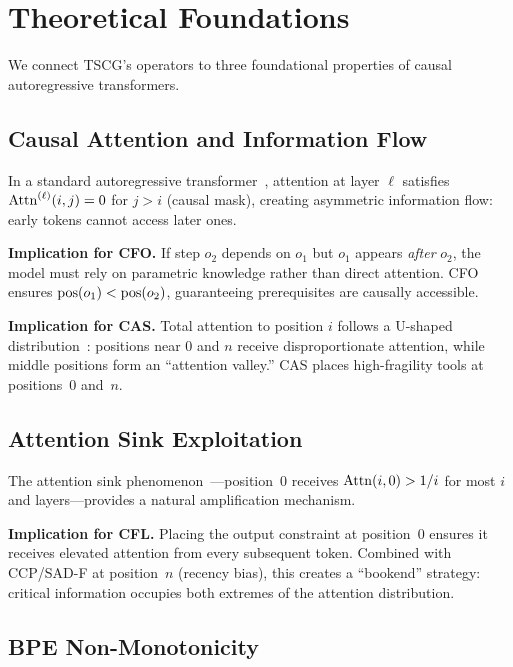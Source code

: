 \section{Theoretical Foundations}
\label{sec:theoretical}


We connect TSCG's operators to three foundational properties of causal autoregressive transformers.

\subsection{Causal Attention and Information Flow}

In a standard autoregressive transformer~\cite{vaswani2017attention}, attention at layer $\ell$ satisfies $\mathrm{Attn}^{(\ell)}(i, j) = 0$ for $j > i$ (causal mask), creating asymmetric information flow: early tokens cannot access later ones.

\textbf{Implication for CFO.} If step $o_2$ depends on $o_1$ but $o_1$ appears \emph{after} $o_2$, the model must rely on parametric knowledge rather than direct attention.
CFO ensures $\mathrm{pos}(o_1) < \mathrm{pos}(o_2)$, guaranteeing prerequisites are causally accessible.

\textbf{Implication for CAS.} Total attention to position $i$ follows a U-shaped distribution~\cite{xiao2023efficient}: positions near 0 and $n$ receive disproportionate attention, while middle positions form an ``attention valley.''
CAS places high-fragility tools at positions~0 and~$n$.

\subsection{Attention Sink Exploitation}

The attention sink phenomenon~\cite{xiao2023efficient}---position~0 receives $\mathrm{Attn}(i, 0) > 1/i$ for most $i$ and layers---provides a natural amplification mechanism.

\textbf{Implication for CFL.} Placing the output constraint at position~0 ensures it receives elevated attention from every subsequent token.
Combined with CCP/SAD-F at position~$n$ (recency bias), this creates a ``bookend'' strategy: critical information occupies both extremes of the attention distribution.

\subsection{BPE Non-Monotonicity}

